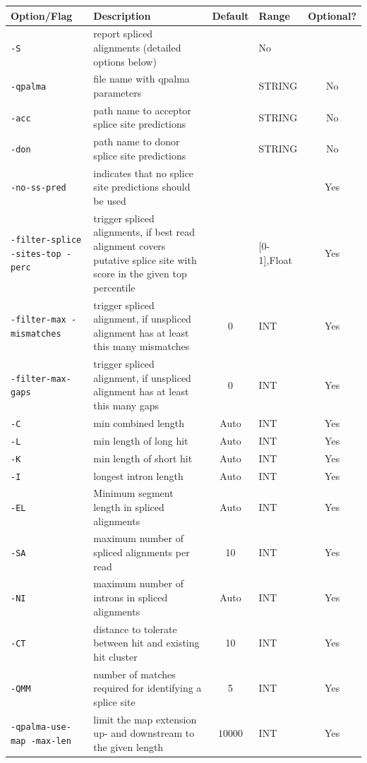 \documentclass{article}
\begin{document}
\begin{table}[h!]
\begin{tabular}{p{3cm}p{6cm}clc}
  \hline
  Option/Flag&Description&Default&Range&Optional?\\
  \hline
\texttt{-S}& report spliced alignments (detailed options below)&&No\\
  \texttt{-qpalma}&file name with qpalma parameters&&STRING&No\\
  \texttt{-acc}&path name to acceptor splice site predictions&&STRING&No\\
  \texttt{-don}&path name to donor splice site predictions&&STRING&No\\
  \texttt{-no-ss-pred}&indicates that no splice site predictions should
  be used&&&Yes\\ 
  \texttt{-filter-splice -sites-top -perc}&trigger spliced alignments, if
  best read alignment covers putative splice site with score in the given top percentile &&[0-1],Float&Yes\\
  \texttt{-filter-max -mismatches}&trigger spliced alignment, if
  unspliced alignment has at least this many mismatches &0&INT&Yes\\
  \texttt{-filter-max-gaps}&trigger spliced alignment, if unspliced
  alignment has at least this many gaps&0&INT&Yes\\
  \texttt{-C}& min combined length&Auto&INT&Yes\\
  \texttt{-L}& min length of long hit&Auto&INT&Yes\\
  \texttt{-K}& min length of short hit&Auto&INT&Yes\\
  \texttt{-I}& longest intron length&Auto&INT&Yes\\ 
  \texttt{-EL}&Minimum segment length in spliced alignments&Auto&INT&Yes\\
  \texttt{-SA}& maximum number of spliced alignments per read &10&INT&Yes\\
  \texttt{-NI}& maximum number of introns in spliced alignments &Auto&INT&Yes\\
  \texttt{-CT}& distance to tolerate between hit and existing hit cluster&10&INT&Yes\\
  \texttt{-QMM}&number of matches required for identifying a splice site&5&INT&Yes\\
  \texttt{-qpalma-use-map -max-len}& limit the map extension up- and
  downstream to the given length &$10000$&INT&Yes\\ 

\end{tabular}
\end{table}
\end{document}
